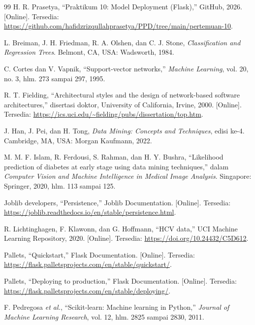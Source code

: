 \documentclass[a4paper,oneside,12pt]{report}
\begin{document}
\begin{thebibliography}{99}
	 H. R. Prasetya, ``Praktikum 10: Model Deployment (Flask),'' GitHub, 2026. [Online]. Tersedia: \url{https://github.com/hafidzrizqullahprasetya/PPD/tree/main/pertemuan-10}.

	 L. Breiman, J. H. Friedman, R. A. Olshen, dan C. J. Stone, \textit{Classification and Regression Trees}. Belmont, CA, USA: Wadsworth, 1984.

	 C. Cortes dan V. Vapnik, ``Support-vector networks,'' \textit{Machine Learning}, vol. 20, no. 3, hlm. 273 sampai 297, 1995.

	 R. T. Fielding, ``Architectural styles and the design of network-based software architectures,'' disertasi doktor, University of California, Irvine, 2000. [Online]. Tersedia: \url{https://ics.uci.edu/~fielding/pubs/dissertation/top.htm}.

	 J. Han, J. Pei, dan H. Tong, \textit{Data Mining: Concepts and Techniques}, edisi ke-4. Cambridge, MA, USA: Morgan Kaufmann, 2022.

	 M. M. F. Islam, R. Ferdousi, S. Rahman, dan H. Y. Bushra, ``Likelihood prediction of diabetes at early stage using data mining techniques,'' dalam \textit{Computer Vision and Machine Intelligence in Medical Image Analysis}. Singapore: Springer, 2020, hlm. 113 sampai 125.

	 Joblib developers, ``Persistence,'' Joblib Documentation. [Online]. Tersedia: \url{https://joblib.readthedocs.io/en/stable/persistence.html}.

	 R. Lichtinghagen, F. Klawonn, dan G. Hoffmann, ``HCV data,'' UCI Machine Learning Repository, 2020. [Online]. Tersedia: \url{https://doi.org/10.24432/C5D612}.

	 Pallets, ``Quickstart,'' Flask Documentation. [Online]. Tersedia: \url{https://flask.palletsprojects.com/en/stable/quickstart/}.

	 Pallets, ``Deploying to production,'' Flask Documentation. [Online]. Tersedia: \url{https://flask.palletsprojects.com/en/stable/deploying/}.

	 F. Pedregosa \textit{et al.}, ``Scikit-learn: Machine learning in Python,'' \textit{Journal of Machine Learning Research}, vol. 12, hlm. 2825 sampai 2830, 2011.


\end{thebibliography}
\end{document}
